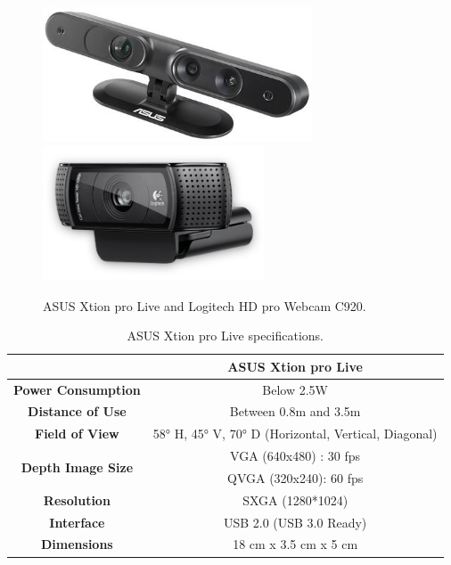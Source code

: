 \begin{figure}[h!]
\begin{center}
\includegraphics[height=4cm]{fig/asusxtionprolive.jpg}
\includegraphics[height=4cm]{fig/logitech-hd-pro-webcam-c920.png}
\end{center}
\caption{ASUS Xtion pro Live and Logitech HD pro Webcam C920.}
\label{fig:cameras}
\end{figure}

\begin{table}[h!]
\begin{center}
\begin{tabular}{|c|c|}
\hline
& \bf{ASUS Xtion pro Live} \\
\hline \bf{ Power Consumption } & Below 2.5W \\
\hline \bf{ Distance of Use } & Between 0.8m and 3.5m \\
\hline \bf{ Field of View } & 58° H, 45° V, 70° D (Horizontal, Vertical, Diagonal) \\
\hline \multirow{2}{*}{\bf{ Depth Image Size }} 
& VGA (640x480) : 30 fps\\
& QVGA (320x240): 60 fps \\
\hline \bf{ Resolution } & SXGA (1280*1024)  \\
\hline \bf{ Interface } & USB 2.0 (USB 3.0 Ready) \\
\hline \bf{ Dimensions } & 18 cm x 3.5 cm x 5 cm \\
\hline
\end{tabular}
\end{center}
\caption{ASUS Xtion pro Live specifications.}
\label{tab:xtion}
\end{table}

